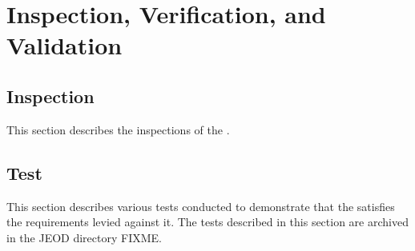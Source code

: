 %
%
%
%
%

\chapter{Inspection, Verification, and Validation}
\label{ch:ivv}

\section{Inspection}\label{sec:inspect}
This section describes the inspections of the \MODELTITLE.

% 

\newpage
\section{Test}
This section describes various tests conducted to demonstrate
that the \MODELTITLEx satisfies the requirements levied against it.
The tests described in this section
are archived in the JEOD directory FIXME.


% 

\newpage
